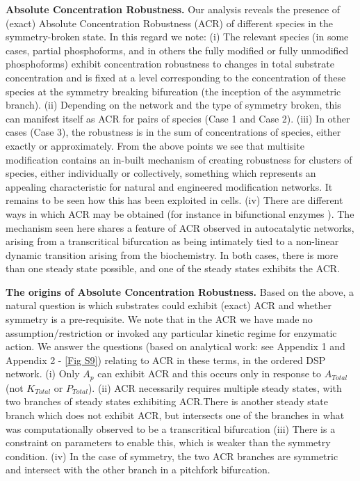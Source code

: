 \documentclass[9pt,lineno]{elife}
\begin{document}
{\bf Absolute Concentration Robustness.} Our analysis reveals the presence of (exact) Absolute Concentration Robustness (ACR) of different species in the symmetry-broken state. In this regard we note:
(i) The relevant species (in some cases, partial phosphoforms, and in others the fully modified or fully unmodified phosphoforms) exhibit concentration robustness to changes in total substrate concentration and is fixed at a level corresponding to the concentration of these species at the symmetry breaking bifurcation (the inception of the asymmetric branch).
(ii) Depending on the network and the type of symmetry broken, this can  manifest itself as ACR for pairs of species (Case 1 and Case 2). (iii) In other cases (Case 3), the robustness is in the sum of concentrations of species, either exactly or approximately. From the above points we see that multisite modification contains an in-built mechanism of creating robustness for clusters of species, either individually or collectively, something which represents an appealing characteristic for natural and engineered modification networks. It remains to be seen how this has been exploited in cells.
(iv) There are different ways in which ACR may be obtained (for instance in bifunctional enzymes \cite{Batchelor2003,Krishnan2020}). The mechanism seen here shares a feature of ACR observed in autocatalytic networks, arising from a transcritical bifurcation \cite{Shinar2011,Krishnan2019} as being intimately tied to a non-linear dynamic transition arising from the biochemistry. In both cases, there is more than one steady state possible, and one of the steady states exhibits the ACR. 

{\bf The origins of Absolute Concentration Robustness.} Based on the above, a natural question is which substrates could exhibit (exact) ACR and whether symmetry is a pre-requisite. We note that in the ACR we have made no assumption/restriction or invoked any particular kinetic regime for enzymatic action. We answer the questions (based on analytical work: see Appendix 1 and Appendix 2 - \cref{Fig S9}) relating to ACR in these terms, in the ordered DSP network. (i) Only $A_p$ can exhibit ACR and this occurs only in response to $A_{Total}$ (not $K_{Total}$ or $P_{Total}$). (ii) ACR necessarily requires multiple steady states, with two branches of steady states exhibiting ACR.There is another steady state branch which does not exhibit ACR, but intersects one of the branches in what was computationally observed to be a transcritical bifurcation (iii) There is a constraint on parameters to enable this, which is weaker than the symmetry condition. (iv) In the case of symmetry, the two ACR branches are symmetric and intersect with the other branch in a pitchfork bifurcation.
\end{document}
